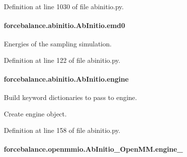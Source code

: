 Definition at line 1030 of file abinitio.\-py.

\hypertarget{classforcebalance_1_1abinitio_1_1AbInitio_af928d333d14cb3b93f7db78530455873}{
\paragraph[{emd0}]{\setlength{\rightskip}{0pt plus 5cm}forcebalance.\-abinitio.\-Ab\-Initio.\-emd0\hspace{0.3cm}{\ttfamily [inherited]}}}\label{classforcebalance_1_1abinitio_1_1AbInitio_af928d333d14cb3b93f7db78530455873}


Energies of the sampling simulation. 



Definition at line 122 of file abinitio.\-py.

\hypertarget{classforcebalance_1_1abinitio_1_1AbInitio_a34058fdf49b7b3b8f1fea78dd30f3209}{
\paragraph[{engine}]{\setlength{\rightskip}{0pt plus 5cm}forcebalance.\-abinitio.\-Ab\-Initio.\-engine\hspace{0.3cm}{\ttfamily [inherited]}}}\label{classforcebalance_1_1abinitio_1_1AbInitio_a34058fdf49b7b3b8f1fea78dd30f3209}


Build keyword dictionaries to pass to engine. 

Create engine object. 

Definition at line 158 of file abinitio.\-py.

\hypertarget{classforcebalance_1_1openmmio_1_1AbInitio__OpenMM_a6eea3c5ab566a09404b13fbbdceead93}{
\paragraph[{engine\-\_\-}]{\setlength{\rightskip}{0pt plus 5cm}forcebalance.\-openmmio.\-Ab\-Initio\-\_\-\-Open\-M\-M.\-engine\-\_\-}}\label{classforcebalance_1_1openmmio_1_1AbInitio__OpenMM_a6eea3c5ab566a09404b13fbbdceead93}


